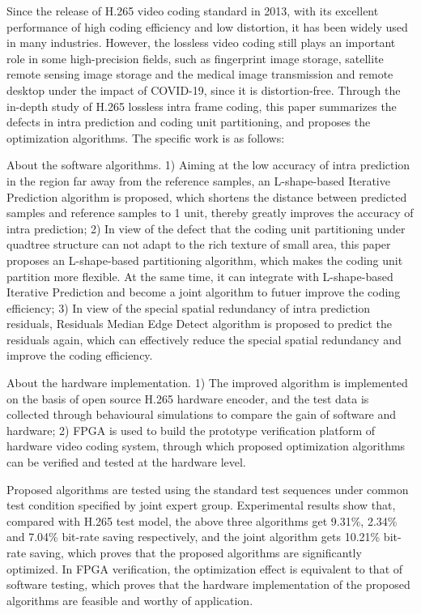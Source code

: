 \begin{eabstract}
    Since the release of H.265 video coding standard in 2013, with its excellent performance of high coding efficiency and low distortion, it has been widely used in many industries. However, the lossless video coding still plays an important role in some high-precision fields, such as fingerprint image storage, satellite remote sensing image storage and the medical image transmission and remote desktop under the impact of COVID-19, since it is distortion-free. Through the in-depth study of H.265 lossless intra frame coding, this paper summarizes the defects in intra prediction and coding unit partitioning, and proposes the optimization algorithms. The specific work is as follows:

    About the software algorithms. 1) Aiming at the low accuracy of intra prediction in the region far away from the reference samples, an L-shape-based Iterative Prediction algorithm is proposed, which shortens the distance between predicted samples and reference samples to 1 unit, thereby greatly improves the accuracy of intra prediction; 2) In view of the defect that the coding unit partitioning under quadtree structure can not adapt to the rich texture of small area, this paper proposes an L-shape-based partitioning algorithm, which makes the coding unit partition more flexible. At the same time, it can integrate with L-shape-based Iterative Prediction and become a joint algorithm to futuer improve the coding efficiency; 3) In view of the special spatial redundancy of intra prediction residuals, Residuals Median Edge Detect algorithm is proposed to predict the residuals again, which can effectively reduce the special spatial redundancy and improve the coding efficiency.

    About the hardware implementation. 1) The improved algorithm is implemented on the basis of open source H.265 hardware encoder, and the test data is collected through behavioural simulations to compare the gain of software and hardware; 2) FPGA is used to build the prototype verification platform of hardware video coding system, through which proposed optimization algorithms can be verified and tested at the hardware level.

    Proposed algorithms are tested using the standard test sequences under common test condition specified by joint expert group. Experimental results show that, compared with H.265 test model, the above three algorithms get 9.31\%, 2.34\% and 7.04\% bit-rate saving respectively, and the joint algorithm gets 10.21\% bit-rate saving, which proves that the proposed algorithms are significantly optimized. In FPGA verification, the optimization effect is equivalent to that of software testing, which proves that the hardware implementation of the proposed algorithms are feasible and worthy of application.

\end{eabstract}

